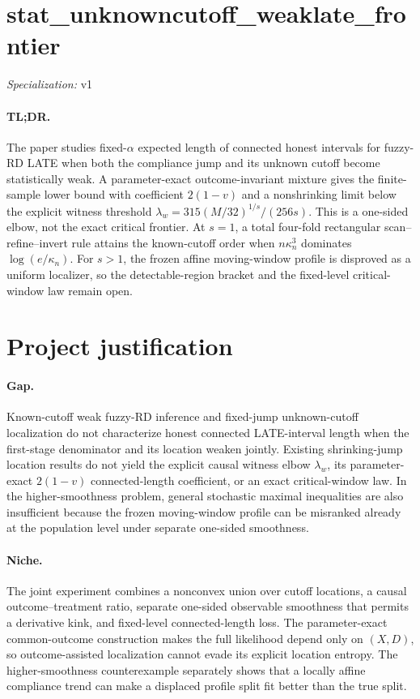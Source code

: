 \documentclass{article}
\begin{document}
\sloppy

\section*{stat\_\allowbreak{}unknowncutoff\_\allowbreak{}weaklate\_\allowbreak{}frontier}

\noindent\textit{Specialization:} v1\par

\paragraph{TL;DR.} The paper studies fixed-\(\alpha\) expected length of connected honest intervals for fuzzy-RD LATE when both the compliance jump and its unknown cutoff become statistically weak.  A parameter-exact outcome-invariant mixture gives the finite-sample lower bound with coefficient \(2(1-v)\) and a nonshrinking limit below the explicit witness threshold \(\lambda_w=315(M/32)^{1/s}/(256s)\).  This is a one-sided elbow, not the exact critical frontier.  At \(s=1\), a total four-fold rectangular scan--refine--invert rule attains the known-cutoff order when \(n\kappa_n^3\) dominates \(\log(e/\kappa_n)\).  For \(s>1\), the frozen affine moving-window profile is disproved as a uniform localizer, so the detectable-region bracket and the fixed-level critical-window law remain open.

\section{Project justification}

\paragraph{Gap.} Known-cutoff weak fuzzy-RD inference and fixed-jump unknown-cutoff localization do not characterize honest connected LATE-interval length when the first-stage denominator and its location weaken jointly.  Existing shrinking-jump location results do not yield the explicit causal witness elbow \(\lambda_w\), its parameter-exact \(2(1-v)\) connected-length coefficient, or an exact critical-window law.  In the higher-smoothness problem, general stochastic maximal inequalities are also insufficient because the frozen moving-window profile can be misranked already at the population level under separate one-sided smoothness.

\paragraph{Niche.} The joint experiment combines a nonconvex union over cutoff locations, a causal outcome--treatment ratio, separate one-sided observable smoothness that permits a derivative kink, and fixed-level connected-length loss.  The parameter-exact common-outcome construction makes the full likelihood depend only on \((X,D)\), so outcome-assisted localization cannot evade its explicit location entropy.  The higher-smoothness counterexample separately shows that a locally affine compliance trend can make a displaced profile split fit better than the true split.
\end{document}
